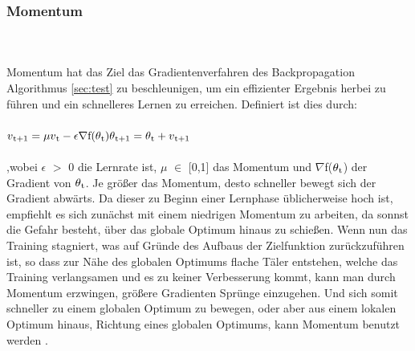 \documentclass{llncs}
\begin{document}
\subsubsection{Momentum}\label{sec:momentum}
~\\\\
Momentum hat das Ziel das Gradientenverfahren des Backpropagation Algorithmus \ref{sec:test} zu beschleunigen, um ein effizienter Ergebnis herbei zu führen und ein schnelleres Lernen zu erreichen. Definiert ist dies durch:
\\\\
\begin{math}
v\textsubscript{t+1} =\mu v\textsubscript{t}-\epsilon\nabla$f$(\theta\textsubscript{t})\\\\
\theta\textsubscript{t+1}= \theta\textsubscript{t}+v\textsubscript{t+1}
\end{math}
\\\\
,wobei $\epsilon$ $>$ 0 die Lernrate ist,  $\mu$ $\in$ [0,1] das Momentum und $\nabla$f($\theta\textsubscript{t}$) der Gradient von $\theta\textsubscript{t}$. Je größer das Momentum, desto schneller bewegt sich der Gradient abwärts. Da dieser zu Beginn einer Lernphase üblicherweise hoch ist, empfiehlt es sich zunächst mit einem niedrigen Momentum zu arbeiten, da sonnst die Gefahr besteht, über das globale Optimum hinaus zu schießen. Wenn nun das Training stagniert, was auf Gründe des Aufbaus der Zielfunktion zurückzuführen ist, so dass zur Nähe des globalen Optimums flache Täler entstehen, welche das Training verlangsamen und es zu keiner Verbesserung kommt, kann man durch Momentum erzwingen, größere Gradienten Sprünge einzugehen. Und sich somit schneller zu einem globalen Optimum zu bewegen, oder aber aus einem lokalen Optimum hinaus, Richtung eines globalen Optimums, kann Momentum benutzt werden \cite{momentum}.
\end{document}
